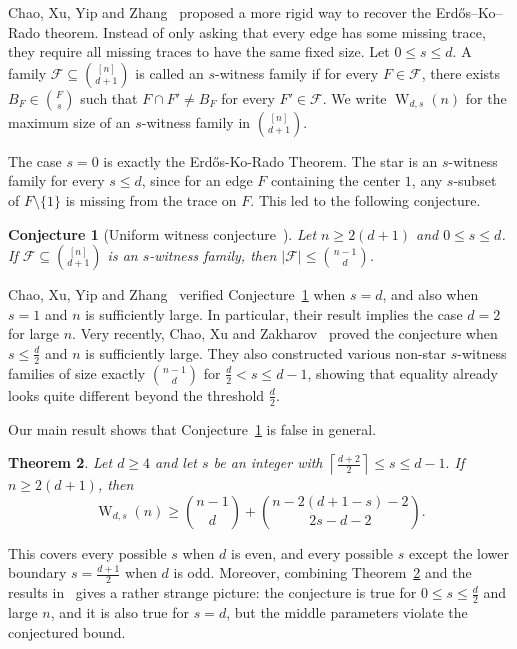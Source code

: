 \documentclass[11pt]{article}
\newtheorem{theorem}{Theorem}[section]
\newtheorem{conj}[theorem]{Conjecture}
\theoremstyle{definition}
\newcommand{\cF}{\mathcal{F}}
\newcommand{\W}{\operatorname{W}}
\begin{document}
Chao, Xu, Yip and Zhang~\cite{2025CombProof} proposed a more rigid way to recover the Erd\H{o}s--Ko--Rado theorem. Instead of only asking that every edge has some missing trace, they require all missing traces to have the same fixed size. Let \(0\le s\le d\). A family \(\cF\subseteq\binom{[n]}{d+1}\) is called an \(s\)-witness family if for every \(F\in\cF\), there exists \(B_F\in\binom{F}{s}\) such that \(F\cap F'\ne B_F\) for every \(F'\in\cF\). We write \(\W_{d,s}(n)\) for the maximum size of an \(s\)-witness family in \(\binom{[n]}{d+1}\).

The case \(s=0\) is exactly the Erd\H{o}s-Ko-Rado Theorem. The star is an \(s\)-witness family for every \(s\le d\), since for an edge \(F\) containing the center \(1\), any \(s\)-subset of \(F\setminus\{1\}\) is missing from the trace on \(F\). This led to the following conjecture.

\begin{conj}[Uniform witness conjecture~\cite{2025CombProof}]\label{conj:witness}
Let \(n\ge2(d+1)\) and \(0\le s\le d\). If \(\cF\subseteq\binom{[n]}{d+1}\) is an \(s\)-witness family, then \(|\cF|\le\binom{n-1}{d}\).
\end{conj}

Chao, Xu, Yip and Zhang~\cite{2025CombProof} verified Conjecture~\ref{conj:witness} when \(s=d\), and also when \(s=1\) and \(n\) is sufficiently large. In particular, their result implies the case \(d=2\) for large \(n\). Very recently, Chao, Xu and Zakharov~\cite{2026Chao} proved the conjecture when \(s\le \frac{d}{2}\) and \(n\) is sufficiently large. They also constructed various non-star \(s\)-witness families of size exactly \(\binom{n-1}{d}\) for \(\frac{d}{2}<s\le d-1\), showing that equality already looks quite different beyond the threshold \(\frac{d}{2}\).

Our main result shows that Conjecture~\ref{conj:witness} is false in general.

\begin{theorem}\label{thm:main}
Let \(d\ge4\) and let \(s\) be an integer with
\(\left\lceil \frac{d+2}{2}\right\rceil\le s\le d-1.\) If \(n\ge2(d+1)\), then
\[
\W_{d,s}(n)\ge\binom{n-1}{d}+\binom{n-2(d+1-s)-2}{2s-d-2}.
\]
\end{theorem}
This covers every possible \(s\) when \(d\) is even, and every possible \(s\) except the lower boundary \(s=\frac{d+1}{2}\) when \(d\) is odd. Moreover, combining Theorem~\ref{thm:main} and the results in~\cite{2025CombProof,2026Chao,1961EKR} gives a rather strange picture: the conjecture is true for \(0\le s\le \frac{d}{2}\) and large \(n\), and it is also true for \(s=d\), but the middle parameters violate the conjectured bound.
\end{document}
